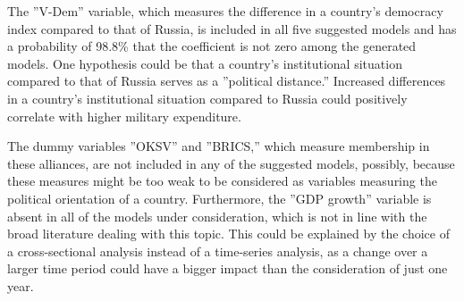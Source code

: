 \documentclass[12pt,a4paper]{article}
\begin{document}
The ''V-Dem'' variable, which measures the difference in a country's democracy index compared to that of Russia, is included in all five suggested models and has a probability of 98.8\% that the coefficient is not zero among the generated models. One hypothesis could be that a country's institutional situation compared to that of Russia serves as a ''political distance.'' Increased differences in a country's institutional situation compared to Russia could positively correlate with higher military expenditure.

The dummy variables ''OKSV'' and ''BRICS,'' which measure membership in these alliances, are not included in any of the suggested models, possibly, because these measures might be too weak to be considered as variables measuring the political orientation of a country. Furthermore, the ''GDP growth'' variable is absent in all of the models under consideration, which is not in line with the broad literature dealing with this topic. This could be explained by the choice of a cross-sectional analysis instead of a time-series analysis, as a change over a larger time period could have a bigger impact than the consideration of just one year.  \\
\end{document}
